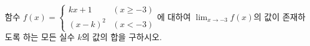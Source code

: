 함수 $f(x)=\begin{cases} kx+1 & (x\ge -3) \\ (x-k)^2 & (x<-3) \end{cases}$에 대하여 $\displaystyle\lim_{x\to-3} f(x)$의 값이 존재하도록 하는 모든 실수 $k$의 값의 합을 구하시오.
